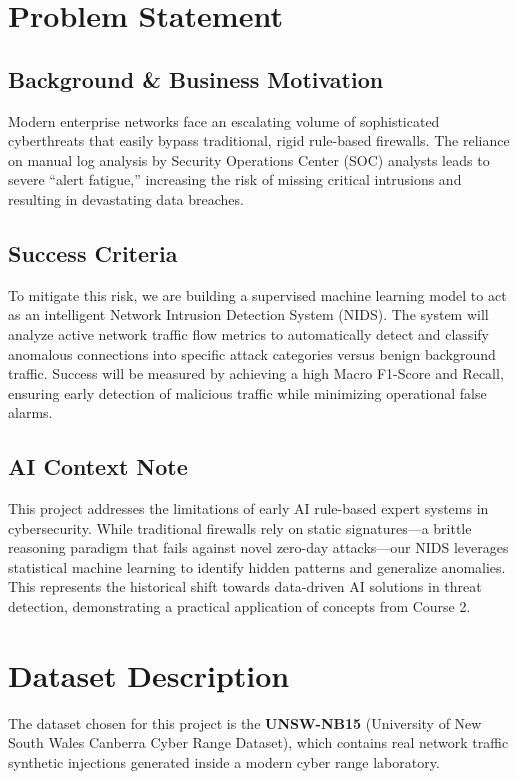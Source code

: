 \documentclass[12pt, a4paper]{article}
\begin{document}
\newpage
\tableofcontents
\newpage







\section{Problem Statement}
\subsection{Background \& Business Motivation}
Modern enterprise networks face an escalating volume of sophisticated cyberthreats that easily bypass traditional, rigid rule-based firewalls. The reliance on manual log analysis by Security Operations Center (SOC) analysts leads to severe ``alert fatigue,'' increasing the risk of missing critical intrusions and resulting in devastating data breaches.

\subsection{Success Criteria}
To mitigate this risk, we are building a supervised machine learning model to act as an intelligent Network Intrusion Detection System (NIDS). The system will analyze active network traffic flow metrics to automatically detect and classify anomalous connections into specific attack categories versus benign background traffic. Success will be measured by achieving a high Macro F1-Score and Recall, ensuring early detection of malicious traffic while minimizing operational false alarms.

\subsection{AI Context Note}
This project addresses the limitations of early AI rule-based expert systems in cybersecurity. While traditional firewalls rely on static signatures---a brittle reasoning paradigm that fails against novel zero-day attacks---our NIDS leverages statistical machine learning to identify hidden patterns and generalize anomalies. This represents the historical shift towards data-driven AI solutions in threat detection, demonstrating a practical application of concepts from Course 2.

\section{Dataset Description}
The dataset chosen for this project is the \textbf{UNSW-NB15} (University of New South Wales Canberra Cyber Range Dataset), which contains real network traffic synthetic injections generated inside a modern cyber range laboratory.
\end{document}
